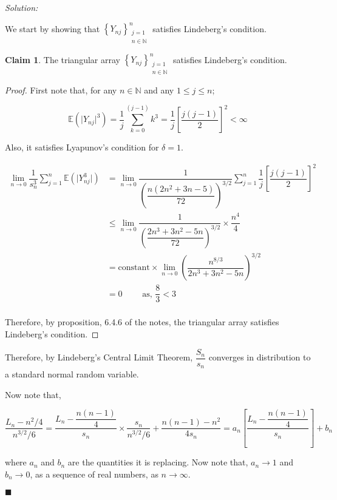 \documentclass[12pt]{article}
\newcommand{\N}{\mathbb{N}}
\newcommand{\E}{\mathbb{E}}
\theoremstyle{definition}
\newenvironment{answer}{\textit{Solution: }\quad }{ \hfill $\blacksquare$}
\newtheorem{claim}{Claim}
\begin{document}
\begin{answer}
\begin{enumerate}
		We start by showing that $\left\{ Y_{nj} \right\}_{\substack{j=1\\n \in \N}}^{n}$ satisfies Lindeberg's condition.

		\begin{claim}
			The triangular array $\left\{ Y_{nj} \right\}_{\substack{j=1\\n \in \N}}^{n}$ satisfies Lindeberg's condition.
		\end{claim}

		\begin{proof}
			First note that, for any $n \in \N$ and any $1 \leq j \leq n$;

			$$\E(\vert Y_{nj} \vert^3) = \dfrac{1}{j} \sum_{k=0}^{(j-1)}k^3 = \dfrac{1}{j} \left[ \dfrac{j(j-1)}{2} \right]^2 < \infty$$

			Also, it satisfies Lyapunov's condition for $\delta = 1$.

			\begin{align*}
				\lim_{n \rightarrow 0} \dfrac{1}{s_n^3} \sum_{j=1}^{n} \E(\vert Y_{nj}^3 \vert)
				& = \lim_{n \rightarrow 0} \dfrac{1}{\left( \dfrac{n(2n^2 + 3n - 5)}{72} \right)^{3/2}} \sum_{j=1}^{n} \dfrac{1}{j} \left[ \dfrac{j(j-1)}{2} \right]^2\\
				& \leq \lim_{n \rightarrow 0} \dfrac{1}{\left( \dfrac{2n^3 + 3n^2 - 5n}{72} \right)^{3/2}} \times \dfrac{n^4}{4}\\
				& = \text{constant} \times \lim_{n \rightarrow 0} \left( \dfrac{n^{8/3}}{2n^3 + 3n^2 - 5n} \right)^{3/2}\\
				& = 0 \qquad \text{ as, } \dfrac{8}{3} < 3\\
			\end{align*}

			Therefore, by proposition, 6.4.6 of the notes, the triangular array satisfies Lindeberg's condition.
		\end{proof}

		Therefore, by Lindeberg's Central Limit Theorem, $\dfrac{S_n}{s_n}$ converges in distribution to a standard normal random variable.

		Now note that,

		$$
		\dfrac{L_n - n^2/4}{n^{3/2} / 6}
		= \dfrac{L_n - \dfrac{n(n-1)}{4}}{s_n} \times \dfrac{s_n}{n^{3/2} / 6} + \dfrac{n(n-1) - n^2}{4s_n}
		= a_n \left[\dfrac{L_n - \dfrac{n(n-1)}{4}}{s_n}\right] + b_n
		$$

		where $a_n$ and $b_n$ are the quantities it is replacing. Now note that, $a_n \rightarrow 1$ and $b_n \rightarrow 0$, as a sequence of real numbers, as $n \rightarrow \infty$. 


\end{enumerate}
\end{answer}
\end{document}

